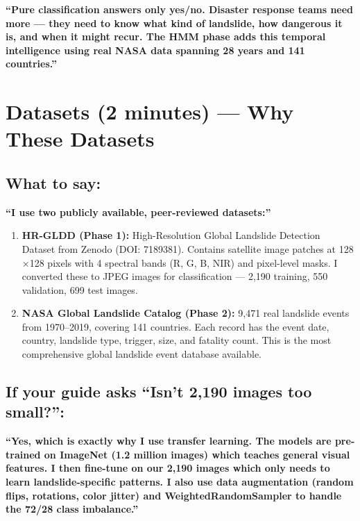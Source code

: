 \documentclass[11pt]{article}
\begin{document}
\textbf{``Pure classification answers only yes/no. Disaster response teams need more --- they need to know what kind of landslide, how dangerous it is, and when it might recur. The HMM phase adds this temporal intelligence using real NASA data spanning 28 years and 141 countries.''}

\section{Datasets (2 minutes) --- Why These Datasets}

\subsection{What to say:}

\textbf{``I use two publicly available, peer-reviewed datasets:''}

\begin{enumerate}
    \item \textbf{HR-GLDD (Phase 1):} High-Resolution Global Landslide Detection Dataset from Zenodo (DOI: 7189381). Contains satellite image patches at 128$\times$128 pixels with 4 spectral bands (R, G, B, NIR) and pixel-level masks. I converted these to JPEG images for classification --- 2,190 training, 550 validation, 699 test images.

    \item \textbf{NASA Global Landslide Catalog (Phase 2):} 9,471 real landslide events from 1970--2019, covering 141 countries. Each record has the event date, country, landslide type, trigger, size, and fatality count. This is the most comprehensive global landslide event database available.
\end{enumerate}

\subsection{If your guide asks ``Isn't 2,190 images too small?'':}

\textbf{``Yes, which is exactly why I use transfer learning. The models are pre-trained on ImageNet (1.2 million images) which teaches general visual features. I then fine-tune on our 2,190 images which only needs to learn landslide-specific patterns. I also use data augmentation (random flips, rotations, color jitter) and WeightedRandomSampler to handle the 72/28 class imbalance.''}
\end{document}
